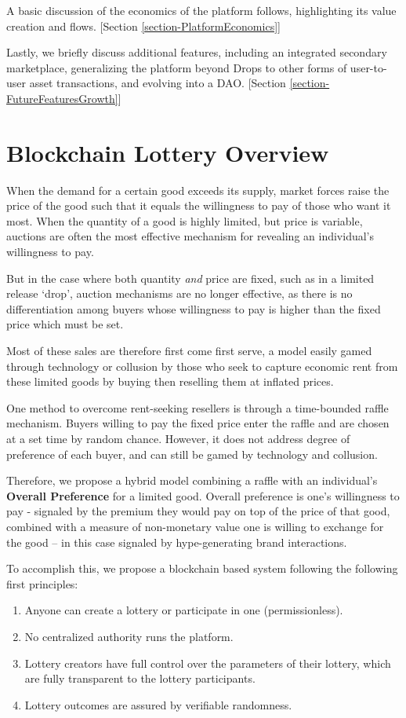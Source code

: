 \documentclass[runningheads]{llncs}
\begin{document}
A basic discussion of the economics of the platform follows, highlighting its value creation and flows. [Section \ref{section-PlatformEconomics}]  

Lastly, we briefly discuss additional features, including an integrated secondary marketplace, generalizing the platform beyond Drops to other forms of user-to-user asset transactions, and evolving into a DAO.   [Section \ref{section-FutureFeaturesGrowth}]


\section{Blockchain Lottery Overview}\label{section-LotteryOverview}

When the demand for a certain good exceeds its supply, market forces raise the price of the good such that it equals the willingness to pay of those who want it most.  When the quantity of a good is highly limited, but price is variable, auctions are often the most effective mechanism for revealing an individual’s willingness to pay.\cite{17}

But in the case where both quantity \emph{and} price are fixed, such as in a limited release ‘drop’, auction mechanisms are no longer effective, as there is no differentiation among buyers whose willingness to pay is higher than the fixed price which must be set.

Most of these sales are therefore first come first serve, a model easily gamed through technology or collusion by those who seek to capture economic rent from these limited goods by buying then reselling them at inflated prices.

One method to overcome rent-seeking resellers is through a time-bounded raffle mechanism.\cite{18}   Buyers willing to pay the fixed price enter the raffle and are chosen at a set time by random chance.  However, it does not address degree of preference of each buyer, and can still be gamed by technology and collusion.

Therefore, we propose a hybrid model combining a raffle with an individual’s \textbf{Overall Preference} for a limited good.  Overall preference is one’s willingness to pay - signaled by the premium they would pay on top of the price of that good, combined with a measure of non-monetary value one is willing to exchange for the good – in this case signaled by hype-generating brand interactions.

To accomplish this, we propose a blockchain based system following the following first principles:
\begin{enumerate}
\item Anyone can create a lottery or participate in one (permissionless).
\item No centralized authority runs the platform.
\item Lottery creators have full control over the parameters of their lottery, which are fully transparent to the lottery participants.
\item Lottery outcomes are assured by verifiable randomness. 
\end{enumerate}
\end{document}
